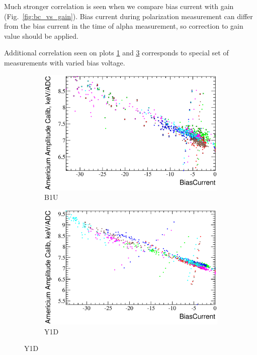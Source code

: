 \documentclass[a4paper]{article}
\begin{document}
Much stronger correlation is seen when we compare bias current with gain (Fig.~\ref{fig:bc_vs_gain}).
Bias current during polarization measurement can differ from the bias current in the time of
alpha measurement, so correction to gain value should be applied.

Additional correlation seen on plots \ref{bc_vs_gain-b1u} and \ref{bc_vs_gain-y1d} corresponds to
special set of measurements with varied bias voltage.

\begin{figure}[p]
\begin{subfigure}[b]{0.5\textwidth}
\includegraphics[width=\textwidth]{gfx/run13_alpha_study/B1U/c_hBiasCurrent_AmAmpCoef.eps}
\caption{B1U}\label{bc_vs_gain-b1u}
\end{subfigure}
\begin{subfigure}[b]{0.5\textwidth}
\includegraphics[width=\textwidth]{gfx/run13_alpha_study/Y1D/c_hBiasCurrent_AmAmpCoef.eps}
\caption{Y1D}\label{bc_vs_gain-y1d}
\end{subfigure}


\end{figure}
\end{document}
